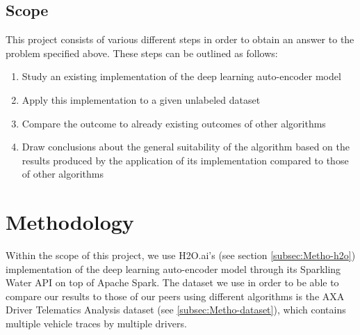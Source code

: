 \documentclass{vldb}
\begin{document}
\subsection{Scope}\label{ssec:scope}
This project consists of various different steps in order to obtain an answer to the problem specified above.
These steps can be outlined as follows:
\begin{enumerate}
	\item Study an existing implementation of the deep learning auto-encoder model
	\item Apply this implementation to a given unlabeled dataset
	\item Compare the outcome to already existing outcomes of other algorithms
	\item Draw conclusions about the general suitability of the algorithm based on the results produced by the application of its implementation compared to those of other algorithms
\end{enumerate}

\section{Methodology}
Within the scope of this project, we use H2O.ai's (see section \ref{subsec:Metho-h2o}) implementation of the deep learning auto-encoder model through its Sparkling Water API on top of Apache Spark. The dataset we use in order to be able to compare our results to those of our peers using different algorithms is the AXA Driver Telematics Analysis dataset (see \ref{subsec:Metho-dataset}), which contains multiple vehicle traces by multiple drivers. 
\end{document}
